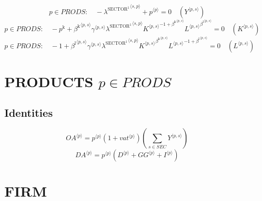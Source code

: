 \begin{equation}
p\in {P\!R\!O\!D\!S}\colon\quad -{\lambda^{\mathrm{SECTOR}^{\mathrm{1}}}}^{\langle s,p\rangle} + {p}^{\langle p\rangle} = 0
 \quad \left({Y}^{\langle p,s\rangle}\right)
\end{equation}
\begin{equation}
p\in {P\!R\!O\!D\!S}\colon\quad -p^{\mathrm{k}} + {{\beta^{\mathrm{k}}}^{\langle p,s\rangle}} {{\gamma}^{\langle p,s\rangle}} {{\lambda^{\mathrm{SECTOR}^{\mathrm{1}}}}^{\langle s,p\rangle}} {{{K}^{\langle p,s\rangle}}^{-1 + {\beta^{\mathrm{k}}}^{\langle p,s\rangle}}} {{{L}^{\langle p,s\rangle}}^{{\beta^{\mathrm{l}}}^{\langle p,s\rangle}}} = 0
 \quad \left({K}^{\langle p,s\rangle}\right)
\end{equation}
\begin{equation}
p\in {P\!R\!O\!D\!S}\colon\quad -1 + {{\beta^{\mathrm{l}}}^{\langle p,s\rangle}} {{\gamma}^{\langle p,s\rangle}} {{\lambda^{\mathrm{SECTOR}^{\mathrm{1}}}}^{\langle s,p\rangle}} {{{K}^{\langle p,s\rangle}}^{{\beta^{\mathrm{k}}}^{\langle p,s\rangle}}} {{{L}^{\langle p,s\rangle}}^{-1 + {\beta^{\mathrm{l}}}^{\langle p,s\rangle}}} = 0
 \quad \left({L}^{\langle p,s\rangle}\right)
\end{equation}




\section{PRODUCTS $p\in {P\!R\!O\!D\!S}$}

\subsection{Identities}

\begin{equation}
{{O\!A}}^{\langle p\rangle} = {{p}^{\langle p\rangle}} \left(1 + {{v\!a\!t}}^{\langle p\rangle}\right) \left(\sum_{s\in {S\!E\!C}} {Y}^{\langle p,s\rangle}\right)
\end{equation}
\begin{equation}
{{D\!A}}^{\langle p\rangle} = {{p}^{\langle p\rangle}} \left({D}^{\langle p\rangle} + {{G\!G}}^{\langle p\rangle} + {I}^{\langle p\rangle}\right)
\end{equation}




\section{FIRM}


